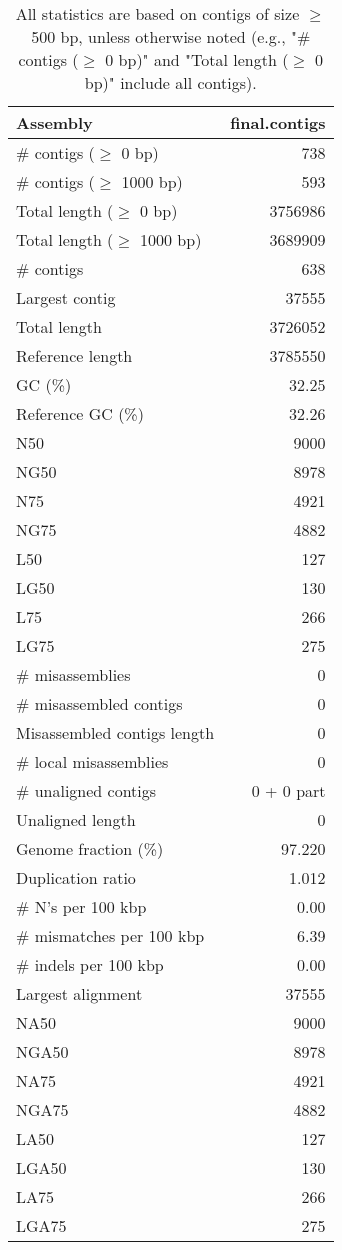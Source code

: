 \documentclass[12pt,a4paper]{article}
\begin{document}
\begin{table}[ht]
\begin{center}
\caption{All statistics are based on contigs of size $\geq$ 500 bp, unless otherwise noted (e.g., "\# contigs ($\geq$ 0 bp)" and "Total length ($\geq$ 0 bp)" include all contigs).}
\begin{tabular}{|l*{1}{|r}|}
\hline
Assembly & final.contigs \\ \hline
\# contigs ($\geq$ 0 bp) & 738 \\ \hline
\# contigs ($\geq$ 1000 bp) & 593 \\ \hline
Total length ($\geq$ 0 bp) & 3756986 \\ \hline
Total length ($\geq$ 1000 bp) & 3689909 \\ \hline
\# contigs & 638 \\ \hline
Largest contig & 37555 \\ \hline
Total length & 3726052 \\ \hline
Reference length & 3785550 \\ \hline
GC (\%) & 32.25 \\ \hline
Reference GC (\%) & 32.26 \\ \hline
N50 & 9000 \\ \hline
NG50 & 8978 \\ \hline
N75 & 4921 \\ \hline
NG75 & 4882 \\ \hline
L50 & 127 \\ \hline
LG50 & 130 \\ \hline
L75 & 266 \\ \hline
LG75 & 275 \\ \hline
\# misassemblies & 0 \\ \hline
\# misassembled contigs & 0 \\ \hline
Misassembled contigs length & 0 \\ \hline
\# local misassemblies & 0 \\ \hline
\# unaligned contigs & 0 + 0 part \\ \hline
Unaligned length & 0 \\ \hline
Genome fraction (\%) & 97.220 \\ \hline
Duplication ratio & 1.012 \\ \hline
\# N's per 100 kbp & 0.00 \\ \hline
\# mismatches per 100 kbp & 6.39 \\ \hline
\# indels per 100 kbp & 0.00 \\ \hline
Largest alignment & 37555 \\ \hline
NA50 & 9000 \\ \hline
NGA50 & 8978 \\ \hline
NA75 & 4921 \\ \hline
NGA75 & 4882 \\ \hline
LA50 & 127 \\ \hline
LGA50 & 130 \\ \hline
LA75 & 266 \\ \hline
LGA75 & 275 \\ \hline
\end{tabular}
\end{center}
\end{table}
\end{document}
